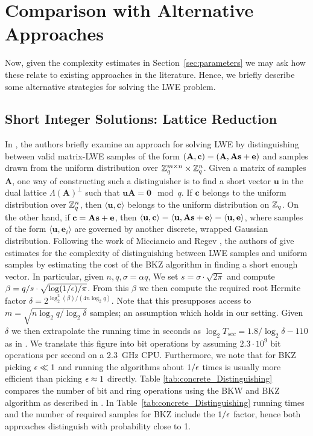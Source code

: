 \section{Comparison with Alternative Approaches}
\label{sec:comparison}
Now, given the complexity estimates in Section~\ref{sec:parameters} we may ask how these relate to existing approaches in the literature. Hence, we briefly describe some alternative strategies for solving the LWE problem.

\subsection{Short Integer Solutions: Lattice Reduction}
In \cite{micciancio-regev:pqc2009}, the authors briefly examine an approach for solving LWE by distinguishing between valid matrix-LWE samples of the form $(\mathbf{A},\mathbf{c})=(\mathbf{A},\mathbf{A}\mathbf{s}+\mathbf{e})$ and samples drawn from the uniform distribution over $\mathbb{Z}_q^{m \times n}\times\mathbb{Z}_q^n$. Given a matrix of samples $\mathbf{A}$, one way of constructing such a distinguisher is to find a short vector $\mathbf{u}$ in the dual lattice $\Lambda(\mathbf{A})^{\perp}$ such that $\mathbf{u}\mathbf{A}=\mathbf{0}\mod q$. If $\mathbf{c}$ belongs to the uniform distribution over $\mathbb{Z}_q^n$, then $\langle\mathbf{u},\mathbf{c}\rangle$ belongs to the uniform distribution on $\mathbb{Z}_q$. On the other hand, if $\mathbf{c}=\mathbf{A}\mathbf{s}+\mathbf{e}$, then $\langle\mathbf{u},\mathbf{c}\rangle=\langle\mathbf{u},\mathbf{A}\mathbf{s}+\mathbf{e}\rangle=\langle\mathbf{u},\mathbf{e}\rangle$, where samples of the form $\langle\mathbf{u},\mathbf{e}_i\rangle$ are governed by another discrete, wrapped Gaussian distribution. Following the work of Micciancio and Regev \cite{micciancio-regev:pqc2009}, the authors of \cite{LindnerP10} give estimates for the complexity of distinguishing between LWE samples and uniform samples by estimating the cost of the BKZ algorithm in finding a short enough vector. In particular, given $n, q, \sigma = \alpha q$, We set $s = \sigma \cdot \sqrt{2\pi}$ and compute $\beta = q/s \cdot \sqrt{\log(1/\epsilon)/\pi}$. From this $\beta$ we then compute the required root Hermite factor $\delta = 2^{ \log_2^2(\beta) / (4n\log_2 q ) }$. Note that this presupposes access to $m = \sqrt{n \log_2 q/\log_2 \delta}$ samples; an assumption which holds in our setting. Given $\delta$ we then extrapolate the running time in seconds as $\log_2 T_{sec} = 1.8/\log_2 \delta - 110$ as in \cite{LindnerP10}. We translate this figure into bit operations by assuming $2.3 \cdot 10^9$ bit operations per second on a 2.3~GHz CPU. Furthermore, we note that for BKZ picking $\epsilon \ll 1$ and running the algorithms about $1/\epsilon$ times is usually more efficient than picking $\epsilon \approx 1$ directly. Table \ref{tab:concrete_Distinguishing} compares the number of bit and ring operations using the BKW and BKZ algorithm as described in \cite{LindnerP10}. In Table~\ref{tab:concrete_Distinguishing} running times and the number of required samples for BKZ include the $1/\epsilon$ factor, hence both approaches distinguish with probability close to 1.

